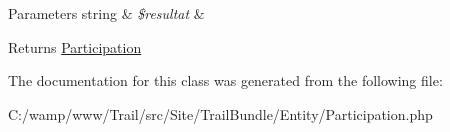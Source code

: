 \begin{DoxyParams}[1]{Parameters}
string & {\em \$resultat} & \\
\hline
\end{DoxyParams}
\begin{DoxyReturn}{Returns}
\hyperlink{class_site_1_1_trail_bundle_1_1_entity_1_1_participation}{Participation} 
\end{DoxyReturn}


The documentation for this class was generated from the following file\+:\begin{DoxyCompactItemize}
\item 
C\+:/wamp/www/\+Trail/src/\+Site/\+Trail\+Bundle/\+Entity/Participation.\+php\end{DoxyCompactItemize}
